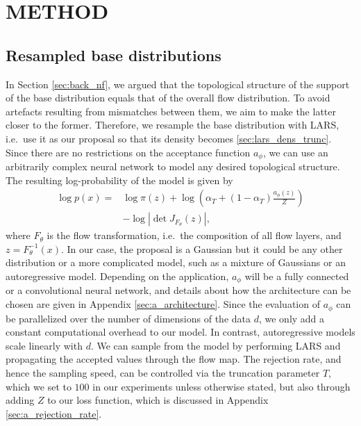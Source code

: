\documentclass[twoside]{article}
\begin{document}
\section{METHOD}
\subsection{Resampled base distributions}
\label{sec:method_basic_idea}

In Section \ref{sec:back_nf}, we argued that the topological structure of the support of the base distribution equals that of the overall flow distribution. To avoid artefacts resulting from mismatches between them, we aim to make the latter closer to the former. Therefore, we resample the base distribution with LARS, i.e.\ use it as our proposal so that its density becomes \eqref{sec:lars_dens_trunc}. Since there are no restrictions on the acceptance function $a_\phi$, we can use an arbitrarily complex neural network to model any desired topological structure. The resulting log-probability of the model is given by
\begin{equation}
    \begin{split}
        \log p(x) = & \log\pi(z) + \log\left( \alpha_T + (1 - \alpha_T)\frac{a_\phi(z)}{Z}\right) \\
        & - \log\left| \det J_{F_\theta}(z)\right| ,
    \end{split}
    \label{equ:flow_dist}
\end{equation}
where $F_\theta$ is the flow transformation, i.e.\ the composition of all flow layers, and $z = F_\theta^{-1}(x)$. In our case, the proposal is a Gaussian but it could be any other distribution or a more complicated model, such as a mixture of Gaussians or an autoregressive model. Depending on the application, $a_\phi$ will be a fully connected or a convolutional neural network, and details about how the architecture can be chosen are given in Appendix \ref{sec:a_architecture}. Since the evaluation of $a_\phi$ can be parallelized over the number of dimensions of the data $d$, we only add a constant computational overhead to our model. In contrast, autoregressive models scale linearly with $d$. We can sample from the model by performing LARS and propagating the accepted values through the flow map. The rejection rate, and hence the sampling speed, can be controlled via the truncation parameter $T$, which we set to $100$ in our experiments unless otherwise stated, but also through adding $Z$ to our loss function, which is discussed in Appendix \ref{sec:a_rejection_rate}.
\end{document}
